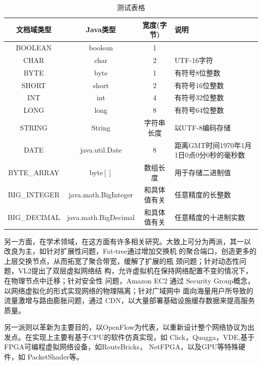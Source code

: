 \documentclass[oneside, phd]{njuthesis}
\begin{document}
\begin{table}
  \centering
  \begin{tabular}{cccp{38mm}}
    \toprule
    \textbf{文档域类型} & \textbf{Java类型} & \textbf{宽度(字节)} & \textbf{说明} \\
    \midrule
    BOOLEAN  & boolean &  1  & \\
    CHAR     & char    &  2  & UTF-16字符 \\
    BYTE     & byte    &  1  & 有符号8位整数 \\
    SHORT    & short   &  2  & 有符号16位整数 \\
    INT      & int     &  4  & 有符号32位整数 \\
    LONG     & long    &  8  & 有符号64位整数 \\
    STRING   & String  &  字符串长度  & 以UTF-8编码存储 \\
    DATE     & java.util.Date & 8 & 距离GMT时间1970年1月1日0点0分0秒的毫秒数 \\
    BYTE\_ARRAY & byte$[]$ & 数组长度 & 用于存储二进制值 \\
    BIG\_INTEGER & java.math.BigInteger & 和具体值有关 & 任意精度的长整数 \\
    BIG\_DECIMAL & java.math.BigDecimal & 和具体值有关 & 任意精度的十进制实数 \\
    \bottomrule
  \end{tabular}
  \caption{测试表格}\label{table:test1}
\end{table}

另一方面，在学术领域，在这方面有许多相关研究。大致上可分为两派，其一以
改良为主，如针对扩展性问题，Fat-tree\cite{al2008scalable}通过增加交换机
的聚合端口，创造更多的上层交换节点，从而拓宽了聚合带宽，缓解了扩展的瓶
颈问题；针对动态性问题，VL2\cite{greenberg2009vl2}提出了双层虚拟网络结
构，允许虚拟机在保持网络配置不变的情况下，在物理节点中迁移；针对安全性
问题，Amazon EC2\cite{varia2010architecting} \cite{hu2011review}通过
Security Group概念，以网络虚拟化的形式实现网络的物理隔离；针对广域网中
面向海量用户所导致的流量激增与路由膨胀问题，通过
CDN\cite{pallis2006insight}，以大量部署基础设施缓存数据来提高服务质量。

另一派则以革新为主要目的，以OpenFlow为代表，以重新设计整个网络协议为出
发点。在实现上主要有基于CPU的软件仿真实现，如
Click\cite{kohler2000click}，Quagga\cite{QUAGGA}，VDE\cite{VDE},基于
FPGA可编程虚拟网络设备，如RouteBricks\cite{dobrescu2009routebricks}，
NetFPGA\cite{lockwood2007netfpga}，以及GPU等特殊硬件，如
PacketShader\cite{han2010packetshader}等。
\end{document}
